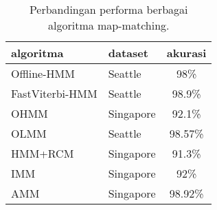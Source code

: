 \begin{table}[h]
\centering
\setlength{\tabcolsep}{6pt}
\caption{Perbandingan performa berbagai algoritma map-matching.}
\label{tab2:map_matching_performance}
\begin{tabular}{l l c }
\hline
\textbf{algoritma} & \textbf{dataset} & \textbf{akurasi} \\
\hline
Offline-HMM  & Seattle & 98\%   \\
FastViterbi-HMM & Seattle & 98.9\% \\
OHMM & Singapore & 92.1\% \\
OLMM & Seattle & 98.57\% \\
HMM+RCM & Singapore & 91.3\% \\
IMM & Singapore & 92\% \\
AMM & Singapore & 98.92\% \\
\hline
\end{tabular}
\end{table}

\newpage

